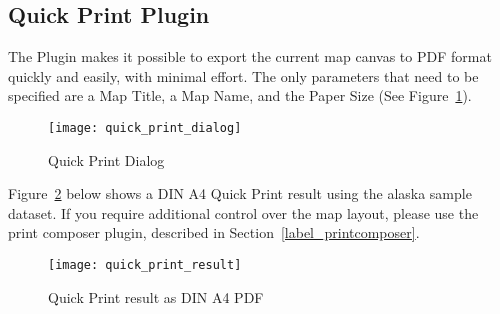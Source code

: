 
\subsection{Quick Print Plugin}


The  Plugin makes it possible to export the current 
map canvas to PDF format quickly and easily, with minimal effort. The only parameters that 
need to be specified are a Map Title, a Map Name, and the Paper Size (See Figure~\ref{fig:quickprint}). 
\begin{figure}[ht]
   \begin{center}
   \caption{Quick Print Dialog \nixcaption}\label{fig:quickprint}\smallskip
   \texttt{[image: quick\_print\_dialog]}
\end{center}
\end{figure}

Figure~\ref{fig:quickprint_result} below shows a DIN A4 Quick Print result 
using the alaska sample dataset. If you require additional control over the map layout, 
please use the print composer plugin, described in Section~\ref{label_printcomposer}.  

\begin{figure}[ht]
   \begin{center}
   \caption{Quick Print result as DIN A4 PDF\nixcaption}\label{fig:quickprint_result}\smallskip
   \texttt{[image: quick\_print\_result]}
\end{center}
\end{figure}
